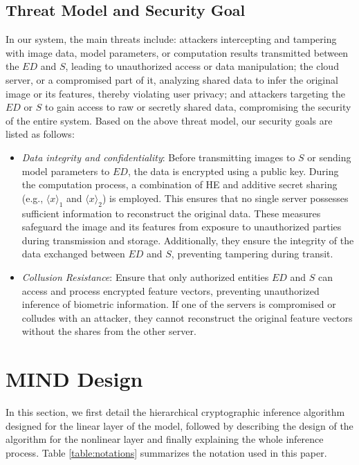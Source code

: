 \documentclass[conference]{IEEEtran}
\begin{document}
\subsection{Threat Model and Security Goal}
In our system, the main threats include: attackers intercepting and tampering with image data, model parameters, or computation results transmitted between the $ED$ and $S$, leading to unauthorized access or data manipulation; the cloud server, or a compromised part of it, analyzing shared data to infer the original image or its features, thereby violating user privacy; and attackers targeting the $ED$ or $S$ to gain access to raw or secretly shared data, compromising the security of the entire system. Based on the above threat model, our security goals are listed as follows:
\begin{itemize}
     \item \textit{Data integrity and confidentiality}: Before transmitting images to $S$ or sending model parameters to $ED$, the data is encrypted using a public key. During the computation process, a combination of HE and additive secret sharing (e.g., $\langle x \rangle_1$ and $\langle x \rangle_2$) is employed. This ensures that no single server possesses sufficient information to reconstruct the original data. These measures safeguard the image and its features from exposure to unauthorized parties during transmission and storage. Additionally, they ensure the integrity of the data exchanged between $ED$ and $S$, preventing tampering during transit. 
     \item \textit{Collusion Resistance}: Ensure that only authorized entities $ED$ and $S$ can access and process encrypted feature vectors, preventing unauthorized inference of biometric information. If one of the servers is compromised or colludes with an attacker, they cannot reconstruct the original feature vectors without the shares from the other server.
 \end{itemize}
 
\section{MIND Design}
In this section, we first detail the hierarchical cryptographic inference algorithm designed for the linear layer of the model, followed by describing the design of the algorithm for the nonlinear layer and finally explaining the whole inference process. Table \ref{table:notations} summarizes the notation used in this paper.
\end{document}
